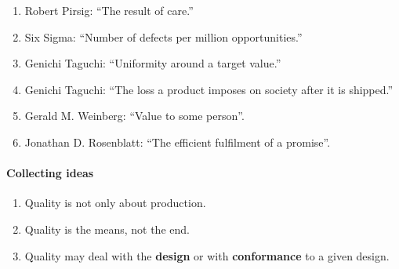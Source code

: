 \documentclass[12pt,a4paper]{report}
\begin{document}
\begin{enumerate}
\item Robert Pirsig: ``The result of care.''
\item Six Sigma: ``Number of defects per million opportunities.''
\item Genichi Taguchi:
``Uniformity around a target value.''
\item Genichi Taguchi:
``The loss a product imposes on society after it is shipped.''
\item Gerald M. Weinberg: ``Value to some person''.
\item Jonathan D. Rosenblatt: ``The efficient fulfilment of a promise''.
\end{enumerate}



\begin{tcolorbox}[breakable]
\paragraph{Collecting ideas}
\begin{enumerate}
\item Quality is not only about production. 
\item Quality is the means, not the end.
\item Quality may deal with the \textbf{design} or with \textbf{conformance} to a given design. 
\end{enumerate}
\end{tcolorbox}
\end{document}
